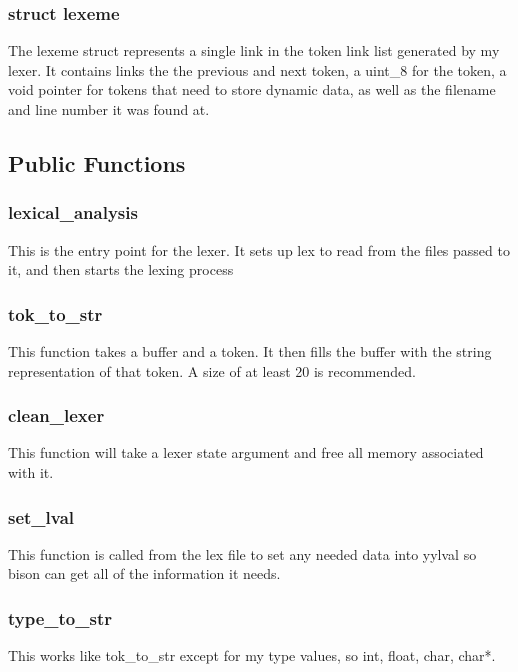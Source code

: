 \documentclass[11pt]{article}
\begin{document}
            \subsubsection{struct lexeme}
                The lexeme struct represents a single link in the token link list generated by my lexer.
                It contains links the the previous and next token, a uint\_8 for the token, a void pointer 
                for tokens that need to store dynamic data, as well as the filename and line number it was found at.

        \subsection{Public Functions}
            
            \subsubsection{lexical\_analysis}
                This is the entry point for the lexer. It sets up lex to read from the files passed to it, and then starts the lexing process

            \subsubsection{tok\_to\_str}
                This function takes a buffer and a token. It then fills the buffer with the string representation of that token.
                A size of at least 20 is recommended.

            \subsubsection{clean\_lexer}
                This function will take a lexer state argument and free all memory associated with it.

            \subsubsection{set\_lval}
                This function is called from the lex file to set any needed data into yylval so bison can get 
                all of the information it needs.

            \subsubsection{type\_to\_str}
                This works like tok\_to\_str except for my type values, so int, float, char, char*.
\end{document}
